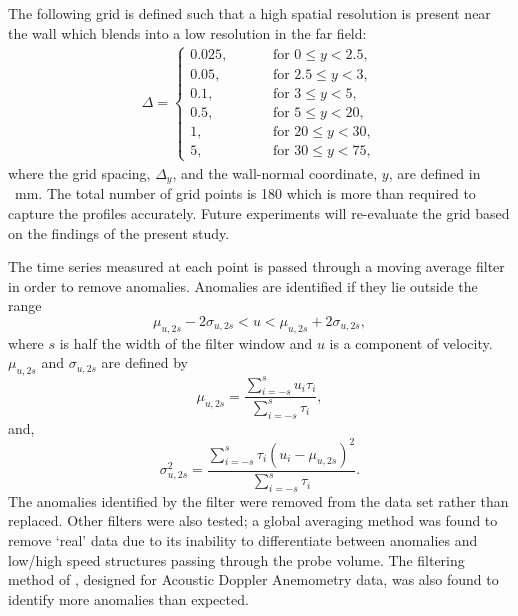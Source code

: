 \documentclass[12pt,oneside,a4paper]{article}
\begin{document}
 The following grid is defined such that a high spatial resolution is present near the wall which blends into a low resolution in the far field:
\begin{align*}
\Delta = 
\begin{cases}
0.025, \hspace{1cm} &\text{for } 0 \leqslant y < 2.5,\\
0.05, \hspace{1cm} &\text{for } 2.5 \leqslant y < 3,\\
0.1, \hspace{1cm} &\text{for } 3 \leqslant y < 5,\\
0.5, \hspace{1cm} &\text{for } 5 \leqslant y < 20,\\
1, \hspace{1cm} &\text{for } 20 \leqslant y < 30,\\
5, \hspace{1cm} &\text{for } 30 \leqslant y < 75,
\end{cases}
\end{align*}
where the grid spacing, $\Delta_y$, and the wall-normal coordinate, $y$, are defined in \SI{}{mm}. The total number of grid points is 180 which is more than required to capture the profiles accurately. Future experiments will re-evaluate the grid based on the findings of the present study.

The time series measured at each point is passed through a moving average filter in order to remove anomalies. Anomalies are identified if they lie outside the range
\begin{equation}
\mu_{u,2s} - 2 \sigma_{u,2s} < u < \mu_{u,2s} + 2 \sigma_{u,2s},
\end{equation}
where $s$ is half the width of the filter window and $u$ is a component of velocity. $\mu_{u,2s}$ and $\sigma_{u,2s}$ are defined by 
\begin{equation}
\mu_{u,2s} = \frac{\sum^s_{i=-s} u_i \tau_i}{\sum^s_{i=-s} \tau_i}, 
\end{equation}
and,
\begin{equation}
\sigma_{u,2s}^2 = \frac{\sum^s_{i=-s} \tau_i (u_i - \mu_{u,2s})^2}{\sum^s_{i=-s} \tau_i}.
\end{equation}
The anomalies identified by the filter were removed from the data set rather than replaced. Other filters were also tested; a global averaging method was found to remove `real' data due to its inability to differentiate between anomalies and low/high speed structures passing through the probe volume. The filtering method of \cite{goring2002}, designed for Acoustic Doppler Anemometry data, was also found to identify more anomalies than expected. 
\end{document}
